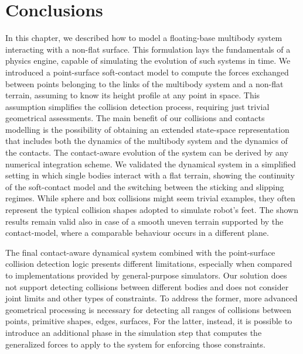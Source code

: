 \section{Conclusions}

In this chapter, we described how to model a floating-base multibody system interacting with a non-flat surface.
This formulation lays the fundamentals of a physics engine, capable of simulating the evolution of such systems in time.
We introduced a point-surface soft-contact model to compute the forces exchanged between points belonging to the links of the multibody system and a non-flat terrain, assuming to know its height profile at any point in space.
This assumption simplifies the collision detection process, requiring just trivial geometrical assessments.
The main benefit of our collisions and contacts modelling is the possibility of obtaining an extended state-space representation that includes both the dynamics of the multibody system and the dynamics of the contacts.
The contact-aware evolution of the system can be derived by any numerical integration scheme.
We validated the dynamical system in a simplified setting in which single bodies interact with a flat terrain, showing the continuity of the soft-contact model and the switching between the sticking and slipping regimes.
While sphere and box collisions might seem trivial examples, they often represent the typical collision shapes adopted to simulate robot's feet.
The shown results remain valid also in case of a smooth uneven terrain supported by the contact-model, where a comparable behaviour occurs in a different plane.

The final contact-aware dynamical system combined with the point-surface collision detection logic presents different limitations, especially when compared to implementations provided by general-purpose simulators.
Our solution does not support detecting collisions between different bodies and does not consider joint limits and other types of constraints.
To address the former, more advanced geometrical processing is necessary for detecting all ranges of collisions between points, primitive shapes, edges, surfaces, \etc
For the latter, instead, it is possible to introduce an additional phase in the simulation step that computes the generalized forces to apply to the system for enforcing those constraints.
